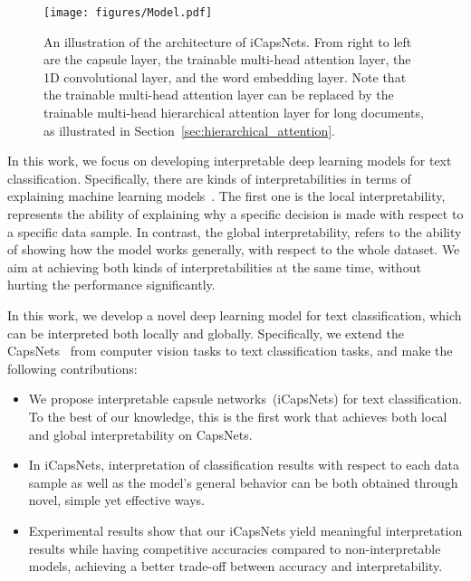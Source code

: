\documentclass[10pt,journal,compsoc]{IEEEtran}
\begin{document}
\begin{figure*}[t]
	\centering
	\texttt{[image: figures/Model.pdf]}
	\caption{An illustration of the architecture of iCapsNets. From right to left are the capsule layer, the trainable multi-head attention layer, the 1D convolutional layer, and the word embedding layer. Note that the trainable multi-head attention layer can be replaced by the trainable multi-head hierarchical attention layer for long documents, as illustrated in Section~\ref{sec:hierarchical_attention}.}
	\label{fig:architecture}
\end{figure*}


In this work, we focus on developing interpretable deep learning models for text classification. Specifically, there are kinds of interpretabilities in terms of explaining machine learning models~\cite{du2018techniques,kopitar2019local}. 
The first one is the local interpretability, represents the ability of explaining why a specific decision is made with respect to a specific data sample. In contrast, the global interpretability, refers to the ability of showing how the model works generally, with respect to the whole dataset.
We aim at achieving both kinds of interpretabilities at the same time, without hurting the performance significantly.


In this work, we develop a novel deep learning model for text classification, which can be interpreted both locally and globally. Specifically, we extend the CapsNets~\cite{sabour2017dynamic} from computer vision tasks to text classification tasks, and make the following contributions:
\begin{itemize}
	\item We propose interpretable capsule networks~(iCapsNets) for text classification. To the best of our knowledge, this is the first work that achieves both local and global interpretability on CapsNets. 
	\item In iCapsNets, interpretation of classification results with respect to each data sample as well as the model's general behavior can be both obtained through novel, simple yet effective ways.
	\item Experimental results show that our iCapsNets yield meaningful interpretation results while having competitive accuracies compared to non-interpretable models, achieving a better trade-off between accuracy and interpretability.
\end{itemize}
\end{document}
